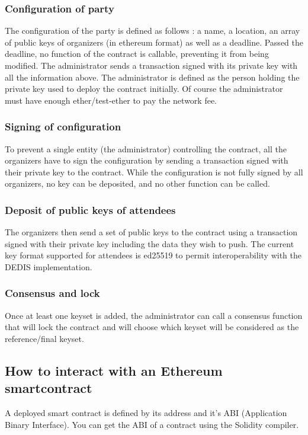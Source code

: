 \documentclass[11pt, a4paper, twoside, openright]{book} %
\begin{document}
\subsubsection{Configuration of party}
The configuration of the party is defined as follows : a name, a location, an array of public keys of organizers (in ethereum format) as well as a deadline. Passed the deadline, no function of the contract is callable, preventing it from being modified. The administrator sends a transaction signed with its private key with all the information above. The administrator is defined as the person holding the private key used to deploy the contract initially. Of course the administrator must have enough ether/test-ether to pay the network fee. 
\subsubsection{Signing of configuration}
 To prevent a single entity (the administrator) controlling the contract, all the organizers have to sign the configuration by sending a transaction signed with their private key to the contract. While the configuration is not fully signed by all organizers, no key can be deposited, and no other function can be called. 
\subsubsection{Deposit of public keys of attendees}  
 The organizers then send a set of public keys to the contract using a transaction signed with their private key including the data they wish to push. The current key format supported for attendees is ed25519 to permit interoperability with the DEDIS implementation.
\subsubsection{Consensus and lock}
Once at least one keyset is added, the administrator can call a consensus function that will lock the contract and will choose which keyset will be considered as the reference/final keyset.


\subsection{How to interact with an Ethereum smartcontract}
A deployed smart contract is defined by its address and it's ABI (Application Binary Interface). You can get the ABI of a contract using the Solidity compiler.
\end{document}
